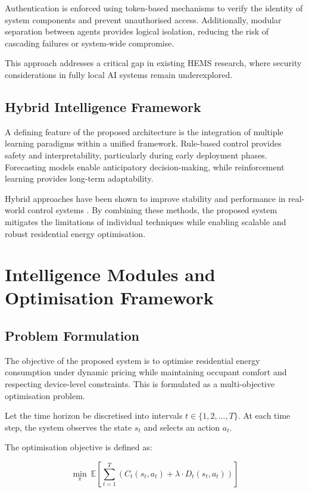 \documentclass[11pt,a4paper]{article}
\begin{document}
Authentication is enforced using token-based mechanisms to verify the identity of system components and prevent unauthorised access. Additionally, modular separation between agents provides logical isolation, reducing the risk of cascading failures or system-wide compromise.

This approach addresses a critical gap in existing HEMS research, where security considerations in fully local AI systems remain underexplored.

\subsection{Hybrid Intelligence Framework}

A defining feature of the proposed architecture is the integration of multiple learning paradigms within a unified framework. Rule-based control provides safety and interpretability, particularly during early deployment phases. Forecasting models enable anticipatory decision-making, while reinforcement learning provides long-term adaptability.

Hybrid approaches have been shown to improve stability and performance in real-world control systems \cite{mason2019reinforcement}. By combining these methods, the proposed system mitigates the limitations of individual techniques while enabling scalable and robust residential energy optimisation.

\section{Intelligence Modules and Optimisation Framework}

\subsection{Problem Formulation}

The objective of the proposed system is to optimise residential energy consumption under dynamic pricing while maintaining occupant comfort and respecting device-level constraints. This is formulated as a multi-objective optimisation problem.

Let the time horizon be discretised into intervals $t \in \{1, 2, ..., T\}$. At each time step, the system observes the state $s_t$ and selects an action $a_t$.

The optimisation objective is defined as:

$$
\min_{\pi} \ \mathbb{E} \left[ \sum_{t=1}^{T} \left( C_t(s_t, a_t) + \lambda \cdot D_t(s_t, a_t) \right) \right]
$$
\end{document}
